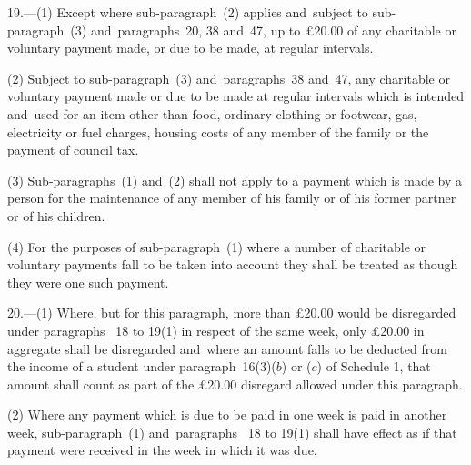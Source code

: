 \documentclass[12pt,a4paper]{article}
\begin{document}

\medskip

19.—(1) Except where sub-paragraph~(2) applies and~subject to sub-\hspace{0pt}paragraph~(3) and~paragraphs~20, 38 and~47, 
up to £20$.$00  %
of any charitable or voluntary payment made, or due to be made, at regular intervals.

(2) Subject to sub-paragraph~(3) and~paragraphs~38 and~47, any charitable or voluntary payment made or due to be made at regular intervals which is intended and~used for an item other than food, ordinary clothing or footwear, gas, electricity or fuel charges, housing costs of any member of the family or the payment of council tax.

(3) Sub-paragraphs~(1) and~(2) shall not apply to a payment which is made by a person for the maintenance of any member of his family or of his former partner or of his children.

(4) For the purposes of sub-paragraph~(1) where a number of charitable or voluntary payments fall to be taken into account they shall be treated as though they were one such payment.


\medskip

20.—(1) Where, but for this paragraph, more than 
£20$.$00  %
would be disregarded under paragraphs~
18 to 19(1)  %
in respect of the same week, only 
£20$.$00  %
in aggregate shall be disregarded and~where an amount falls to be deducted from the income of a student under paragraph~16(3)($b$) or ($c$) of Schedule 1, that amount shall count as part of the 
£20$.$00  %
disregard allowed under this paragraph.

(2) Where any payment which is due to be paid in one week is paid in another week, sub-paragraph~(1) and~paragraphs~
18 to 19(1)  %
shall have effect as if that payment were received in the week in which it was due.
\end{document}
